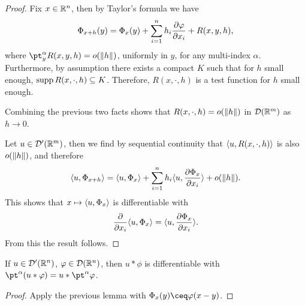 \begin{proof}
    Fix $x \in \mathbb R^n$, then by Taylor's formula we have
    \[
    \Phi_{x + h}(y) = \Phi_x(y) + \sum_{i=1}^n h_i \pdv{\varphi}{x_i} (x, y)+ R(x, y, h), 
    \]
    where $\pt_y^\alpha R(x, y, h) = o(\norm{h})$, uniformly in $y$, for any multi-index $\alpha$. Furthermore, by assumption there exists a compact $K$ such that for $h$ small enough, $\operatorname{supp} R(x, \cdot, h) \subseteq K$. Therefore, $R(x, \cdot, h)$ is a test function for $h$ small enough.
    
    Combining the previous two facts shows that $R(x, \cdot, h) = o(\norm{h})$ in $\mathcal D(\mathbb R^m)$ as $h \to 0$. 
    
    Let $u \in \mathcal D'(\mathbb R^m)$, then we find by sequential continuity that $\langle u, R(x, \cdot, h)\rangle$ is also $o(\norm{h})$, and therefore
    \[
    \langle u, \Phi_{x+h}\rangle = \langle u, \Phi_x\rangle + \sum_{i=1}^n h_i \langle u, \pdv{\Phi_x}{x_i}\rangle + o(\norm{h}). 
    \]
    This shows that $x \mapsto \langle u, \Phi_x\rangle$ is differentiable with 
    \[
    \pdv{x_i} \langle u, \Phi_x\rangle  = \langle u, \pdv{\Phi_x}{x_i}\rangle. 
    \]
    From this the result follows. 
\end{proof}

\begin{corollary}
    If $u \in \mathcal D'(\mathbb R^n)$, $\varphi \in \mathcal D(\mathbb R^n)$, then $u * \phi$ is differentiable with $\pt^\alpha (u * \phi) = u * \pt^\alpha\phi$. 
\end{corollary}

\begin{proof}
    Apply the previous lemma with $\Phi_x(y) \ceq  \phi(x-y)$. 
\end{proof}